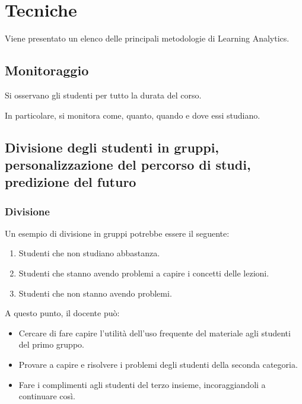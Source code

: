 \clearpage

\section{Tecniche}

Viene presentato un elenco delle principali metodologie di Learning Analytics.

\subsection{Monitoraggio}
Si osservano gli studenti per tutto la durata del corso.

In particolare, si monitora come, quanto, quando e dove essi studiano.

\subsection{Divisione degli studenti in gruppi, personalizzazione del percorso di studi, predizione del futuro}

\subsubsection{Divisione}

Un esempio di divisione in gruppi potrebbe essere il seguente:

\begin{enumerate}

\item Studenti che non studiano abbastanza. 
\item Studenti che stanno avendo problemi a capire i concetti delle lezioni.
\item Studenti che non stanno avendo problemi.

\end{enumerate}

A questo punto, il docente può:

\begin{itemize}

\item Cercare di fare capire l'utilità dell'uso frequente del materiale agli studenti del primo gruppo.
\item Provare a capire e risolvere i problemi degli studenti della seconda categoria.
\item Fare i complimenti agli studenti del terzo insieme, incoraggiandoli a continuare così.

\end{itemize}

